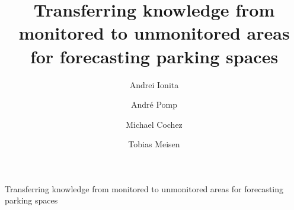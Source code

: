 \documentclass{ws-ijait}
\begin{document}
{Transferring knowledge from monitored to unmonitored areas for forecasting parking spaces}

%
\catchline{}{}{}{}{}
%

\title{Transferring knowledge from monitored to unmonitored areas for forecasting parking spaces}


\author{Andrei Ionita}
\address{%
	Computer Science, RWTH Aachen University \\
	Aachen, Germany \\
	andrei.ionita@rwth-aachen.de
}


\author{André Pomp}
\address{%
	Institute of Information Management in Mechanical Engineering, RWTH Aachen University,\\
	Aachen Germany \\
	andre.pomp@ima.rwth-aachen.de
}


\author{Michael Cochez}
\address{
	Fraunhofer Institute for Applied Information Technology FIT, Aachen, Germany \\
	Computer Science 5, RWTH Aachen University, Germany \\
	Faculty of Information Technology, University of Jyväskylä, Finland \\
	michael.cochez@fit.fraunhofer.de
}

\author{Tobias Meisen}
\address{%
	Chair of Technologies and Management of Digital Transformation, University of Wuppertal, \\
	Wuppertal, Germany \\
	meisen@uni-wuppertal.de
}
\end{document}
